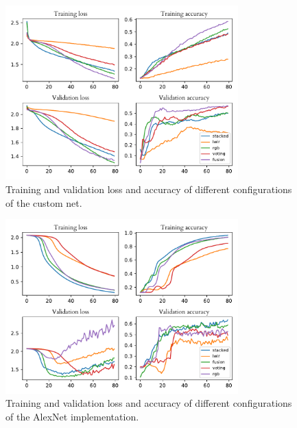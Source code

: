\documentclass{l4proj}
\begin{document}
\begin{appendices}
\begin{figure}[ht]
  \centering
  \includegraphics[width=0.8\textwidth]{images/evaluation/gridsearch/CustomNet}
  \caption{Training and validation loss and accuracy of different configurations of the custom net.}
  \label{fig:customnet_configs}
\end{figure}

\begin{figure}[ht]
  \centering
  \includegraphics[width=0.8\textwidth]{images/evaluation/gridsearch/AlexNet}
  \caption{Training and validation loss and accuracy of different configurations of the AlexNet implementation.}
  \label{fig:alexnet_configs}
\end{figure}


\end{appendices}
\end{document}
